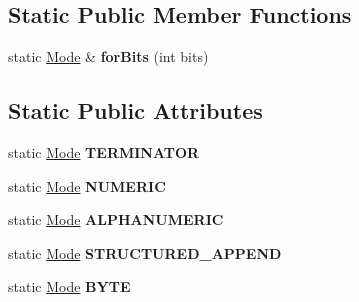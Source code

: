 \subsection*{Static Public Member Functions}
\begin{DoxyCompactItemize}
\item 
\mbox{\label{classzxing_1_1qrcode_1_1_mode_a9e84b8e95c18f7437b19546c7081cb77}} 
static \mbox{\hyperlink{classzxing_1_1qrcode_1_1_mode}{Mode}} \& {\bfseries for\+Bits} (int bits)
\end{DoxyCompactItemize}
\subsection*{Static Public Attributes}
\begin{DoxyCompactItemize}
\item 
\mbox{\label{classzxing_1_1qrcode_1_1_mode_a5fb21097c5aec20398a238440738f87e}} 
static \mbox{\hyperlink{classzxing_1_1qrcode_1_1_mode}{Mode}} {\bfseries T\+E\+R\+M\+I\+N\+A\+T\+OR}
\item 
\mbox{\label{classzxing_1_1qrcode_1_1_mode_a1af22907af6b997d8fa7ddb6b81de1e6}} 
static \mbox{\hyperlink{classzxing_1_1qrcode_1_1_mode}{Mode}} {\bfseries N\+U\+M\+E\+R\+IC}
\item 
\mbox{\label{classzxing_1_1qrcode_1_1_mode_a205fa385c411b9ad6830bcc918b6f2a1}} 
static \mbox{\hyperlink{classzxing_1_1qrcode_1_1_mode}{Mode}} {\bfseries A\+L\+P\+H\+A\+N\+U\+M\+E\+R\+IC}
\item 
\mbox{\label{classzxing_1_1qrcode_1_1_mode_a6e248721d97480d2125d7658898c387f}} 
static \mbox{\hyperlink{classzxing_1_1qrcode_1_1_mode}{Mode}} {\bfseries S\+T\+R\+U\+C\+T\+U\+R\+E\+D\+\_\+\+A\+P\+P\+E\+ND}
\item 
\mbox{\label{classzxing_1_1qrcode_1_1_mode_ad5ad861861ae6a7016ad8b4439098ebf}} 
static \mbox{\hyperlink{classzxing_1_1qrcode_1_1_mode}{Mode}} {\bfseries B\+Y\+TE}
\item 
\mbox{\label{classzxing_1_1qrcode_1_1_mode_a9dac77752f15c6c7e9a4c0be44129631}} 

\end{DoxyCompactItemize}
